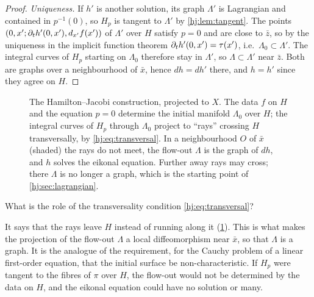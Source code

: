 \begin{proof}
  \emph{Uniqueness.}  If $h'$ is another solution, its graph $\Lambda'$ is
  Lagrangian and contained in $p^{-1}(0)$, so $H_p$ is tangent to $\Lambda'$ by
  \cref{hj:lem:tangent}.  The points $(0,x';\partial_th'(0,x'),d_{x'}f(x'))$ of
  $\Lambda'$ over $H$ satisfy $p=0$ and are close to $\bar z$, so by the uniqueness
  in the implicit function theorem $\partial_th'(0,x')=\tau(x')$, i.e.\
  $\Lambda_0\subset\Lambda'$.  The integral curves of $H_p$ starting on
  $\Lambda_0$ therefore stay in $\Lambda'$, so $\Lambda\subset\Lambda'$ near
  $\bar z$.  Both are graphs over a neighbourhood of $\bar x$, hence $dh=dh'$
  there, and $h=h'$ since they agree on $H$.
\end{proof}

\begin{figure}[ht]
  \centering
  \caption{The Hamilton--Jacobi construction, projected to $X$. The data $f$ on $H$
  and the equation $p=0$ determine the initial manifold $\Lambda_0$ over $H$; the
  integral curves of $H_p$ through $\Lambda_0$ project to ``rays'' crossing $H$
  transversally, by \eqref{hj:eq:transversal}. In a neighbourhood $O$ of $\bar x$
  (shaded) the rays do not meet, the flow-out $\Lambda$ is the graph of $dh$, and $h$
  solves the eikonal equation. Further away rays may cross; there $\Lambda$ is no longer
  a graph, which is the starting point of \cref{hj:sec:lagrangian}.}
  \label{hj:fig:flowout}
\end{figure}

\begin{question}
What is the role of the transversality condition \eqref{hj:eq:transversal}?
\end{question}
\begin{answer}
It says that the rays leave $H$ instead of running along it
(\cref{hj:fig:flowout}). This is what makes the projection of the flow-out
$\Lambda$ a local diffeomorphism near $\bar x$, so that $\Lambda$ is a graph. It is
the analogue of the requirement, for the Cauchy problem of a linear first-order
equation, that the initial surface be non-characteristic. If $H_p$ were tangent to
the fibres of $\pi$ over $H$, the flow-out would not be determined by the data on $H$,
and the eikonal equation could have no solution or many.
\end{answer}

